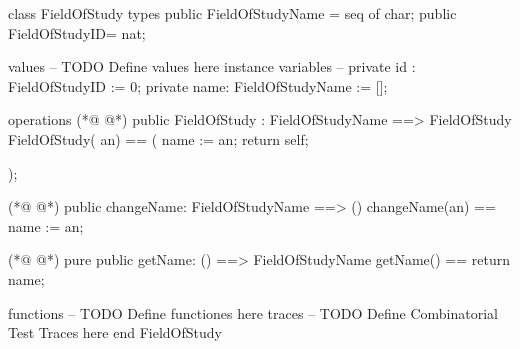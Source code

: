 \begin{vdmpp}[breaklines=true]
class FieldOfStudy
types
public FieldOfStudyName = seq of char;
public FieldOfStudyID= nat;


values
-- TODO Define values here
instance variables
 -- private id : FieldOfStudyID := 0;
 private name: FieldOfStudyName := [];



operations
(*@
\label{FieldOfStudy:16}
@*)
 public FieldOfStudy : FieldOfStudyName  ==> FieldOfStudy
  FieldOfStudy( an) ==
  (
  name := an;
  return self;
  
  );
 
(*@
\label{changeName:24}
@*)
 public changeName: FieldOfStudyName ==> ()
 changeName(an) ==
 name :=  an;
 
  
(*@
\label{getName:29}
@*)
 pure public getName: () ==> FieldOfStudyName
  getName() == return name;



functions
-- TODO Define functiones here
traces
-- TODO Define Combinatorial Test Traces here
end FieldOfStudy
\end{vdmpp}
